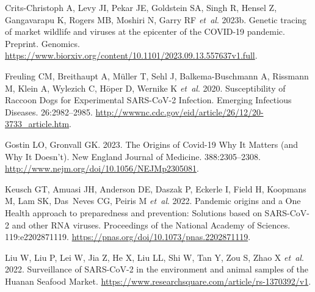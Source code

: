 \documentclass[11pt]{article}
\begin{document}
\begin{thebibliography}{24}
{{Crits-Christoph} A, Levy JI, Pekar JE, Goldstein SA, Singh R, Hensel Z,
  Gangavarapu K, Rogers MB, Moshiri N, Garry RF {\em et~al\/}}. 2023{b}.
  Genetic tracing of market wildlife and viruses at the epicenter of the
  {{COVID-19}} pandemic. Preprint. {Genomics}.
  \url{https://www.biorxiv.org/content/10.1101/2023.09.13.557637v1.full}.

{Freuling CM, Breithaupt A, M{\"u}ller T, Sehl J, {Balkema-Buschmann} A,
  Rissmann M, Klein A, Wylezich C, H{\"o}per D, Wernike K {\em et~al\/}}. 2020.
  Susceptibility of {{Raccoon Dogs}} for {{Experimental SARS-CoV-2 Infection}}.
  Emerging Infectious Diseases. 26:2982--2985.
  \url{http://wwwnc.cdc.gov/eid/article/26/12/20-3733_article.htm}.

{Gostin LO, Gronvall GK}. 2023. The {{Origins}} of {{Covid-19}} \textemdash{}
  {{Why It Matters}} (and {{Why It Doesn}}'t). New England Journal of Medicine.
  388:2305--2308. \url{http://www.nejm.org/doi/10.1056/NEJMp2305081}.

{Keusch GT, Amuasi JH, Anderson DE, Daszak P, Eckerle I, Field H, Koopmans M,
  Lam SK, Das~Neves CG, Peiris M {\em et~al\/}}. 2022. Pandemic origins and a
  {{One Health}} approach to preparedness and prevention: {{Solutions}} based
  on {{SARS-CoV-2}} and other {{RNA}} viruses. Proceedings of the National
  Academy of Sciences. 119:e2202871119.
  \url{https://pnas.org/doi/10.1073/pnas.2202871119}.

{Liu W, Liu P, Lei W, Jia Z, He X, Liu LL, Shi W, Tan Y, Zou S, Zhao X {\em
  et~al\/}}. 2022. Surveillance of {{SARS-CoV-2}} in the environment and animal
  samples of the {{Huanan Seafood Market}}.
  \url{https://www.researchsquare.com/article/rs-1370392/v1}.


\end{thebibliography}
\end{document}

